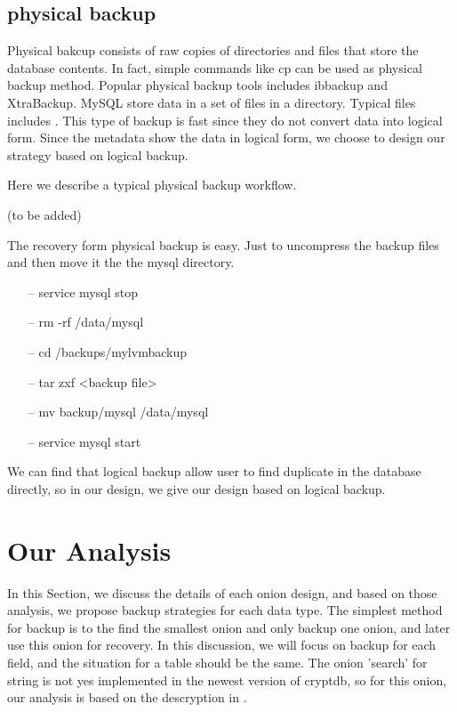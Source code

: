 \subsection{physical backup}

Physical bakcup consists of raw copies of directories and files that store the database contents\citep{mysqlbackupdocumentation}. In fact, simple commands like cp can be used as physical backup method. Popular physical backup tools includes ibbackup and XtraBackup\citep{xtrabackup}. MySQL store data in a set of files in a directory. Typical files includes .
This type of backup is fast since they do not convert data into logical form. Since the metadata show the data in logical form, we choose to design our strategy based on logical backup. 


Here we describe a typical physical backup workflow. 

(to be added)

The recovery form physical backup is easy. Just to uncompress the backup files and then move it the the mysql directory. 


\begin{itemize}
\item[--] service mysql stop
\item[--] rm -rf /data/mysql
\item[--] cd /backups/mylvmbackup
\item[--] tar zxf <backup file>
\item[--] mv backup/mysql /data/mysql
\item[--] service mysql start
\end{itemize}


We can find that logical backup allow user to find duplicate in the database directly, so in our design, we give our design based on logical backup.





\section{Our Analysis}

In this Section, we discuss the details of each onion design, and based on those analysis, we propose backup strategies for each data type. The simplest method for backup is to the find the smallest onion and only backup one onion, and later use this onion for recovery. In this discussion, we will focus on backup for each field, and the situation for a table should be the same. The onion 'search' for string is not yes implemented in the newest version of cryptdb, so for this onion, our analysis is based on the descryption in \citep{song2000practical}.

